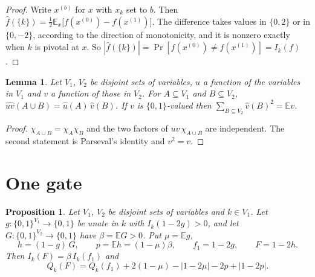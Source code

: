 \documentclass[11pt]{amsart}
\newtheorem{lemma}[theorem]{Lemma}
\newtheorem{proposition}[theorem]{Proposition}
\theoremstyle{definition}\newtheorem{definition}[theorem]{Definition}
\theoremstyle{remark}\newtheorem{remark}[theorem]{Remark}
\newcommand{\E}{\mathbb{E}}
\newcommand{\hf}{\widehat{f}}
\begin{document}
\begin{proof}
Write $x^{(b)}$ for $x$ with $x_k$ set to $b$. Then $\hf(\{k\})=\tfrac12\E_x\bigl[f(x^{(0)})-f(x^{(1)})\bigr]$. The
difference takes values in $\{0,2\}$ or in $\{0,-2\}$, according to the direction of monotonicity, and it is nonzero
exactly when $k$ is pivotal at $x$. So $|\hf(\{k\})|=\Pr[f(x^{(0)})\ne f(x^{(1)})]=I_k(f)$.
\end{proof}

\begin{lemma}\label{lem:prod}
Let $V_1$, $V_2$ be disjoint sets of variables, $u$ a function of the variables in $V_1$ and $v$ a function of those
in $V_2$. For $A\subseteq V_1$ and $B\subseteq V_2$, $\widehat{uv}(A\cup B)=\widehat u(A)\,\widehat v(B)$. If $v$ is
$\{0,1\}$-valued then $\sum_{B\subseteq V_2}\widehat v(B)^2=\E v$.
\end{lemma}

\begin{proof}
$\chi_{A\cup B}=\chi_A\chi_B$ and the two factors of $uv\,\chi_{A\cup B}$ are independent. The second statement is
Parseval's identity and $v^2=v$.
\end{proof}

\section{One gate}\label{sec:step}

\begin{proposition}\label{prop:step}
Let $V_1$, $V_2$ be disjoint sets of variables and $k\in V_1$. Let $g\colon\{0,1\}^{V_1}\to\{0,1\}$ be unate in $k$
with $I_k(1-2g)>0$, and let $G\colon\{0,1\}^{V_2}\to\{0,1\}$ have $\beta=\E G>0$. Put $\mu=\E g$,
\[
h=(1-g)\,G,\qquad p=\E h=(1-\mu)\beta,\qquad f_1=1-2g,\qquad F=1-2h .
\]
Then $I_k(F)=\beta\,I_k(f_1)$ and
\begin{equation}\label{eq:step}
Q_k(F)=Q_k(f_1)+2(1-\mu)-|1-2\mu|-2p+|1-2p| .
\end{equation}
\end{proposition}
\end{document}
